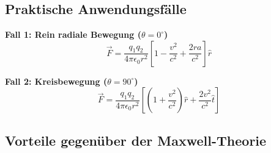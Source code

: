 \subsection{Praktische Anwendungsfälle}

\textbf{Fall 1: Rein radiale Bewegung ($\theta = 0^\circ$)}
\begin{equation}
\vec{F} = \frac{q_1 q_2}{4\pi\epsilon_0 r^2}\left[1 - \frac{v^2}{c^2} + \frac{2r a}{c^2}\right]\hat{r}
\end{equation}

\textbf{Fall 2: Kreisbewegung ($\theta = 90^\circ$)}
\begin{equation}
\vec{F} = \frac{q_1 q_2}{4\pi\epsilon_0 r^2}\left[\left(1 + \frac{v^2}{c^2}\right)\hat{r} + \frac{2v^2}{c^2}\hat{t}\right]
\end{equation}

\subsection{Vorteile gegenüber der Maxwell-Theorie}

